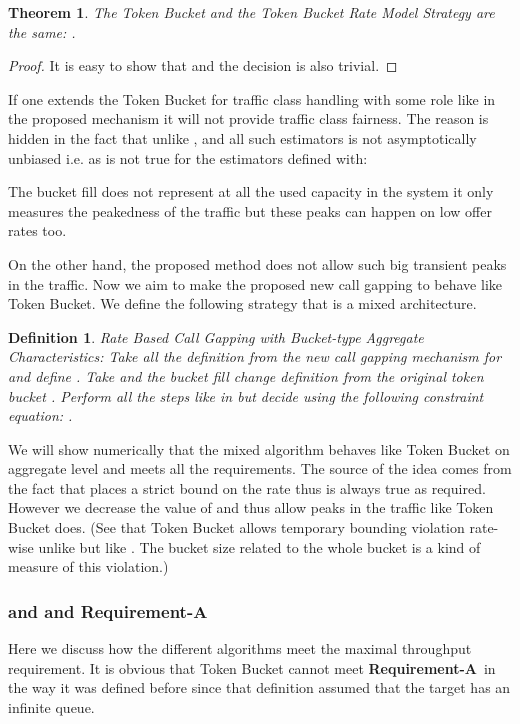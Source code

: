 \documentclass[conference]{IEEEtran}
\newtheorem{theorem}{Theorem}
\newtheorem{definition}{Definition}
\newcommand{\reqA}{\textbf{Requirement-A}}
\begin{document}
\begin{theorem}
The Token Bucket and the Token Bucket Rate Model Strategy are the
same: .
\end{theorem}

\begin{proof} It is easy to show that  and the decision is  also trivial.\end{proof}

If one extends the Token Bucket for traffic class handling with some
role like in the proposed mechanism it will not provide traffic
class fairness. The reason is hidden in the fact that unlike
,  and all
such estimators is not asymptotically unbiased i.e.
 as  is not true for the
estimators defined with:


The bucket fill does not represent at all the used capacity in the
system it only measures the peakedness of the traffic but these
peaks can happen on low offer rates too.

On the other hand, the proposed method does not allow such big
transient peaks in the traffic. Now we aim to make the proposed new
call gapping to behave like Token Bucket. We define the following
strategy that is a mixed architecture.

\begin{definition}
Rate Based Call Gapping with Bucket-type Aggregate Characteristics:
 Take all the definition from the new call gapping
mechanism  for  and
define . Take  and the bucket fill change
definition  from the original token bucket . Perform
all the steps like in  but decide using the following
constraint equation: .
\end{definition}

We will show numerically that the mixed algorithm behaves like Token
Bucket on aggregate level and meets all the requirements. The source
of the idea comes from the fact that  places a strict
bound on the rate thus  is always true as
required. However we decrease the value of  and thus allow
peaks in the traffic like Token Bucket does. (See that Token Bucket
 allows temporary bounding violation rate-wise unlike
 but like . The bucket size related to the whole
bucket is a kind of measure of this violation.)

\subsubsection{ and  and Requirement-A\ }
Here we discuss how the different algorithms meet the maximal
throughput requirement. It is obvious that Token Bucket cannot meet
\reqA\ in the way it was defined before since that definition
assumed that the target has an infinite queue.
\end{document}

